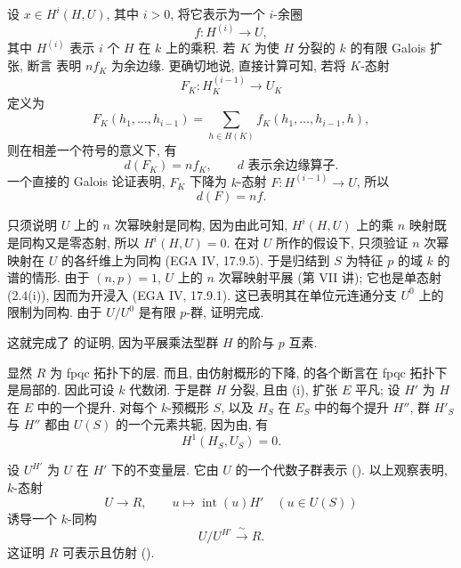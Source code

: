 设 \(x\in H^i(H,U)\), 其中 \(i>0\), 将它表示为一个 \(i\)-余圈
\[
  f:H^{(i)}\longrightarrow U,
\]
其中 \(H^{(i)}\) 表示 \(i\) 个 \(H\) 在 \(k\) 上的乘积.
若 \(K\) 为使 \(H\) 分裂的 \(k\) 的有限 Galois 扩张,
断言 表明 \(nf_K\) 为余边缘.
更确切地说, 直接计算可知, 若将 \(K\)-态射
\[
  F_K:H_K^{(i-1)}\longrightarrow U_K
\]
定义为
\[
  F_K(h_1,\ldots,h_{i-1})
    =\sum_{h\in H(K)}
      f_K(h_1,\ldots,h_{i-1},h),
\]
则在相差一个符号的意义下, 有
\[
  d(F_K)=nf_K,
  \qquad d\text{ 表示余边缘算子}.
\]
一个直接的 Galois 论证表明, \(F_K\) 下降为 \(k\)-态射 \(F:H^{(i-1)}\to U\), 所以
\[
  d(F)=nf.
\]


只须说明 \(U\) 上的 \(n\) 次幂映射是同构,
因为由此可知, \(H^i(H,U)\) 上的乘 \(n\) 映射既是同构又是零态射,
所以 \(H^i(H,U)=0\).
在对 \(U\) 所作的假设下, 只须验证 \(n\) 次幂映射在 \(U\) 的各纤维上为同构
(EGA IV, 17.9.5). 于是归结到 \(S\) 为特征 \(p\) 的域 \(k\) 的谱的情形.
由于 \((n,p)=1\), \(U\) 上的 \(n\) 次幂映射平展 (第 VII 讲);
它也是单态射 (2.4(i)), 因而为开浸入 (EGA IV, 17.9.1).
这已表明其在单位元连通分支 \(U^0\) 上的限制为同构.
由于 \(U/U^0\) 是有限 \(p\)-群, 证明完成.

这就完成了
的证明, 因为平展乘法型群 \(H\) 的阶与 \(p\) 互素.

显然 \(R\) 为 fpqc 拓扑下的层.
而且, 由仿射概形的下降, 
的各个断言在 fpqc 拓扑下是局部的. 因此可设 \(k\) 代数闭.
于是群 \(H\) 分裂, 且由 (i), 扩张 \(E\) 平凡;
设 \(H'\) 为 \(H\) 在 \(E\) 中的一个提升.
对每个 \(k\)-预概形 \(S\), 以及 \(H_S\) 在 \(E_S\) 中的每个提升 \(H''\),
群 \(H'_S\) 与 \(H''\) 都由 \(U(S)\) 的一个元素共轭, 因为由,
有
\[
  H^1(H_S,U_S)=0.
\]

设 \(U^{H'}\) 为 \(U\) 在 \(H'\) 下的不变量层.
它由 \(U\) 的一个代数子群表示 ().
以上观察表明, \(k\)-态射
\[
  U\longrightarrow R,
  \qquad
  u\longmapsto \operatorname{int}(u)H'
  \quad (u\in U(S))
\]
诱导一个 \(k\)-同构
\[
  U/U^{H'}\xrightarrow{\ \sim\ }R.
\]
这证明 \(R\) 可表示且仿射 ().

